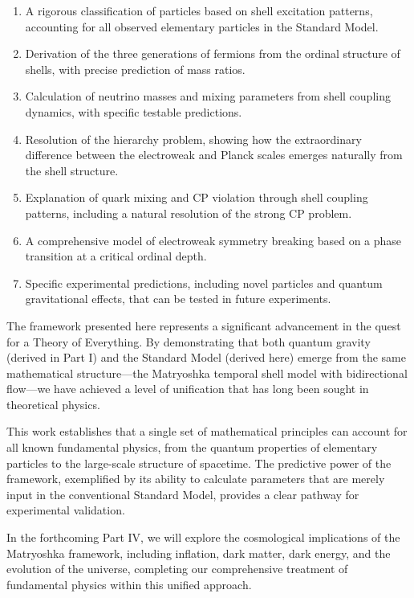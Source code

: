 \documentclass[12pt,a4paper]{article}
\begin{document}
\begin{enumerate}
    \item A rigorous classification of particles based on shell excitation patterns, accounting for all observed elementary particles in the Standard Model.
    
    \item Derivation of the three generations of fermions from the ordinal structure of shells, with precise prediction of mass ratios.
    
    \item Calculation of neutrino masses and mixing parameters from shell coupling dynamics, with specific testable predictions.
    
    \item Resolution of the hierarchy problem, showing how the extraordinary difference between the electroweak and Planck scales emerges naturally from the shell structure.
    
    \item Explanation of quark mixing and CP violation through shell coupling patterns, including a natural resolution of the strong CP problem.
    
    \item A comprehensive model of electroweak symmetry breaking based on a phase transition at a critical ordinal depth.
    
    \item Specific experimental predictions, including novel particles and quantum gravitational effects, that can be tested in future experiments.
\end{enumerate}

The framework presented here represents a significant advancement in the quest for a Theory of Everything. By demonstrating that both quantum gravity (derived in Part I) and the Standard Model (derived here) emerge from the same mathematical structure—the Matryoshka temporal shell model with bidirectional flow—we have achieved a level of unification that has long been sought in theoretical physics.

This work establishes that a single set of mathematical principles can account for all known fundamental physics, from the quantum properties of elementary particles to the large-scale structure of spacetime. The predictive power of the framework, exemplified by its ability to calculate parameters that are merely input in the conventional Standard Model, provides a clear pathway for experimental validation.

In the forthcoming Part IV, we will explore the cosmological implications of the Matryoshka framework, including inflation, dark matter, dark energy, and the evolution of the universe, completing our comprehensive treatment of fundamental physics within this unified approach.



\end{document}
